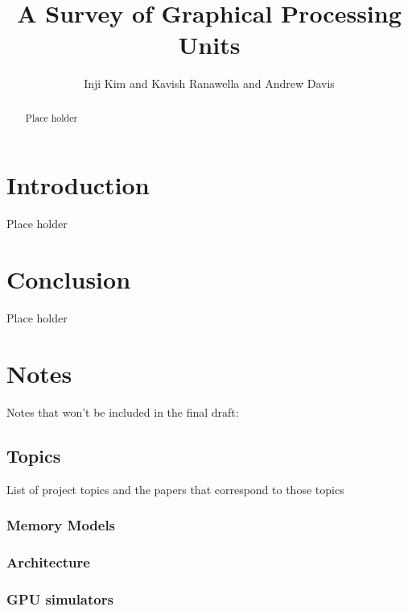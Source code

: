 \documentclass[conference]{IEEEtran}
\title{A Survey of Graphical Processing Units}
\author{\normalsize{Inji Kim and Kavish Ranawella and Andrew Davis}}
\begin{document}
\maketitle
\thispagestyle{plain}
\pagestyle{plain}




\begin{abstract}
Place holder
\end{abstract}

\section{Introduction}
Place holder



\section{Conclusion}
Place holder


\clearpage
\appendix
\section{Notes}
Notes that won't be included in the final draft:
\subsection{Topics}
List of project topics and the papers that correspond to those topics
\subsubsection{Memory Models}
\cite{Bakhoda2009}
\cite{Ibrahim2020}
\cite{Singh2013}
\cite{Pratheek2023}
\cite{Mei2015}
\cite{Liu2018}
\cite{Fung2011ISM}
\cite{Jog2013OWL}
\cite{Kadam2018}
\cite{Liu2020}
\cite{Jog2013}
\subsubsection{Architecture}
\cite{Bakhoda2009}
\cite{Yan2022}
\cite{Hayes2019}
\cite{Sanudo2020}
\cite{Laguna2022}
\cite{Zhu2019}
\cite{Fung2011HPC}
\subsubsection{GPU simulators}
\cite{Khairy2020}
\cite{Kandiah2021}
\cite{Bakhoda2009}
\cite{Hayes2019}
\cite{Raihan2018}
\cite{Liu2020}
\cite{Jog2013}




\end{document}
